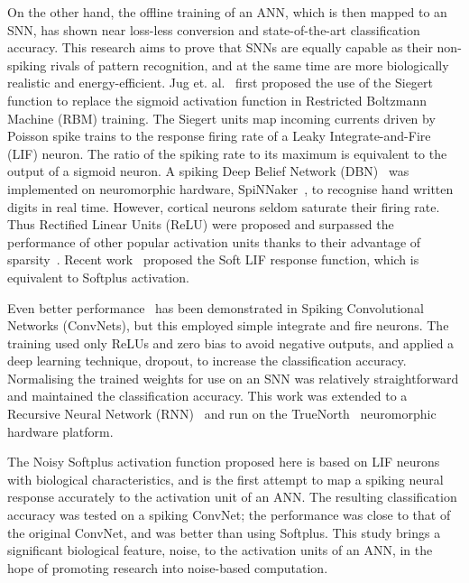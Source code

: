 
On the other hand, the offline training of an ANN, which is then mapped to an SNN, has shown near loss-less conversion and state-of-the-art classification accuracy.
This research aims to prove that SNNs are equally capable as their non-spiking rivals of pattern recognition, and at the same time are more biologically realistic and energy-efficient.
Jug et. al.~\cite{Jug_etal_2012} first proposed the use of the Siegert function to replace the sigmoid activation function in Restricted Boltzmann Machine (RBM) training.
The Siegert units map incoming currents driven by Poisson spike trains to the response firing rate of a Leaky Integrate-and-Fire (LIF) neuron.
The ratio of the spiking rate to its maximum is equivalent to the output of a sigmoid neuron.
A spiking Deep Belief Network (DBN)~\cite{Stromatias2015scalable} was implemented on neuromorphic hardware, SpiNNaker~\cite{furber2014spinnaker}, to recognise hand written digits in real time.
However, cortical neurons seldom saturate their firing rate.
Thus Rectified Linear Units (ReLU) were proposed and surpassed the performance of other popular activation units thanks to their advantage of sparsity~\cite{glorot2011deep}.
Recent work~\cite{hunsberger2015spiking} proposed the Soft LIF response function, which is equivalent to Softplus activation.

Even better performance~\cite{cao2015spiking,diehl2015fast} has been demonstrated in Spiking Convolutional Networks (ConvNets), but this employed simple integrate and fire neurons.
The training used only ReLUs and zero bias to avoid negative outputs, and applied a deep learning technique, dropout, to increase the classification accuracy.
Normalising the trained weights for use on an SNN was relatively straightforward and maintained the classification accuracy.
This work was extended to a Recursive Neural Network (RNN)~\cite{diehl2016conversion} and run on the TrueNorth~\cite{merolla2014million} neuromorphic hardware platform.

The Noisy Softplus activation function proposed here is based on LIF neurons with biological characteristics, and is the first attempt to map a spiking neural response accurately to the activation unit of an ANN.
The resulting classification accuracy was tested on a spiking ConvNet; the performance was close to that of the original ConvNet, and was better than using Softplus.
This study brings a significant biological feature, noise, to the activation units of an ANN, in the hope of promoting research into noise-based computation.
	
